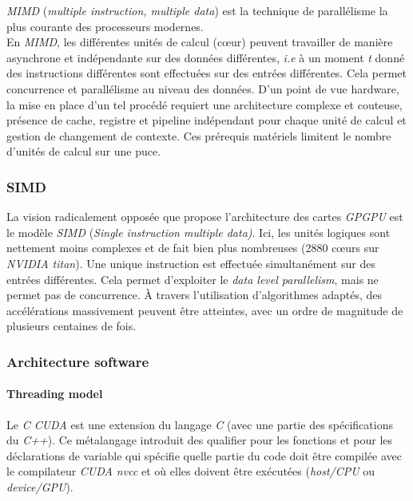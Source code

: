 \documentclass[french, 11pt]{memoir}
\begin{document}
\emph{MIMD} (\emph{multiple instruction, multiple data}) est la
technique de parallélisme la plus courante des processeurs modernes. \\
En \emph{MIMD}, les différentes unités de calcul (cœur) peuvent
travailler de manière asynchrone et indépendante sur des données
différentes, \textit{i.e} à un moment \textit{t} donné des instructions différentes sont
effectuées sur des entrées différentes. Cela permet concurrence et
parallélisme au niveau des données. D'un point de vue hardware, la mise
en place d'un tel procédé requiert une architecture complexe et
couteuse, présence de cache, registre et pipeline indépendant pour
chaque unité de calcul et gestion de changement de contexte. Ces
prérequis matériels limitent le nombre d'unités de calcul sur une puce.

\subsubsection{SIMD}\label{simd}

La vision radicalement opposée que propose l'architecture des cartes
\emph{GPGPU} est le modèle \emph{SIMD} (\emph{Single instruction
multiple data)}. Ici, les unités logiques sont nettement moins complexes
et de fait bien plus nombreuses (2880 cœurs sur \emph{NVIDIA titan}).
Une unique instruction est effectuée simultanément sur des entrées
différentes. Cela permet d'exploiter le \emph{data level parallelism},
mais ne permet pas de concurrence. À travers l'utilisation d'algorithmes
adaptés, des accélérations massivement peuvent être atteintes, avec un
ordre de magnitude de plusieurs centaines de fois.

\subsubsection{Architecture software}\label{architecture-software}

\paragraph{Threading model}\label{threading-model}

Le \emph{C CUDA} est une extension du langage \emph{C} (avec une partie
des spécifications du \textit{C++}). Ce métalangage\cite{sanders2010cuda} introduit des
qualifier pour les fonctions et pour les déclarations de variable qui
spécifie quelle partie du code doit être compilée avec le compilateur
\textit{CUDA nvcc} et où elles doivent être exécutées (\emph{host/CPU} ou
\textit{device/GPU}).
\end{document}
